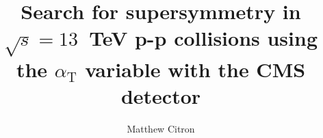 \documentclass{mythesis}
\title{Search for supersymmetry in $\sqrt{s} = 13$~TeV p-p collisions
using the $\alpha_\text{T}$ variable with the CMS detector}
\author{Matthew Citron}
\begin{document}

\begin{frontmatter}
  
\end{frontmatter}

\begin{mainmatter}










\end{mainmatter}

% 
% 

\begin{appendices}
    
\end{appendices}

\begin{backmatter}
 

\end{backmatter}

\end{document}
